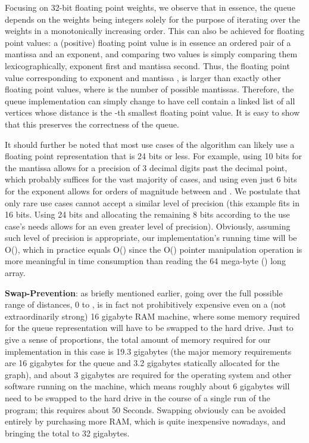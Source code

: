 \documentclass[conference,10pt,twocolumn]{IEEEtran}
\begin{document}
Focusing on 32-bit floating point weights, we observe that in essence, the queue depends on the weights being integers solely for the purpose of iterating over the weights in a monotonically increasing order. This can also be achieved for floating point values: a (positive) floating point value is in essence an ordered pair of a mantissa and an exponent, and comparing two values is simply comparing them lexicographically, exponent first and mantissa second. Thus, the floating point value corresponding to exponent  and mantissa , is larger than exactly  other floating point values, where  is the number of possible mantissas. Therefore, the queue implementation can simply change to have cell  contain a linked list of all vertices whose distance is the -th smallest floating point value. It is easy to show that this preserves the correctness of the queue.

It should further be noted that most use cases of the algorithm can likely use a floating point representation that is 24 bits or less. For example, using 10 bits for the mantissa allows for a precision of 3 decimal digits past the decimal point, which probably suffices for the vast majority of cases, and using even just 6 bits for the exponent allows for orders of magnitude between  and . We postulate that only rare use cases cannot accept a similar level of precision (this example fits in 16 bits. Using 24 bits and allocating the remaining 8 bits according to the use case's needs allows for an even greater level of precision). Obviously, assuming such level of precision is appropriate, our implementation's running time will be O(), which in practice equals O() since the O() pointer manipulation operation is more meaningful in time consumption than reading the 64 mega-byte () long array.

{\bf Swap-Prevention}: as briefly mentioned earlier, going over the full possible range of distances, 0 to , is in fact not prohibitively expensive even on a (not extraordinarily strong) 16 gigabyte RAM machine, where some memory required for the queue representation will have to be swapped to the hard drive. Just to give a sense of proportions, the total amount of memory required for our implementation in this case is 19.3 gigabytes (the major memory requirements are 16 gigabytes for the queue and 3.2 gigabytes statically allocated for the graph), and about 3 gigabytes are required for the operating system and other software running on the machine, which means roughly about 6 gigabytes will need to be swapped to the hard drive in the course of a single run of the program;  this requires about 50 Seconds. Swapping obviously can be avoided entirely by purchasing more RAM, which is quite inexpensive nowadays, and bringing the total to 32 gigabytes.
\end{document}
